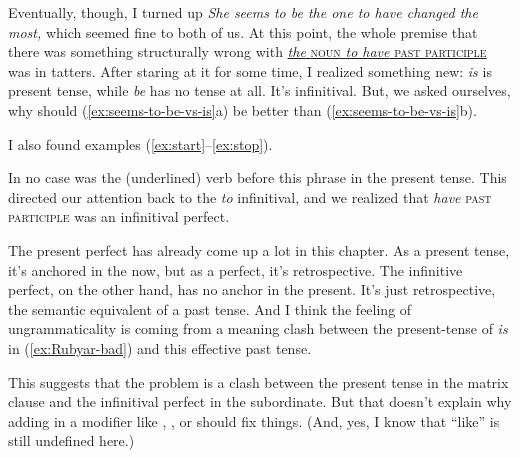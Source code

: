 Eventually, though, I turned up \textit{She seems to be the one to have changed the most,} which seemed fine to both of us. At this point, the whole premise that there was something structurally wrong with \uline{\textit{the} \textsc{noun} \textit{to have} \textsc{past participle}} was in tatters. After staring at it for some time, I realized something new: \textit{is} is present tense, while \textit{be} has no tense at all. It's infinitival. But, we asked ourselves, why should (\ref{ex:seems-to-be-vs-is}a) be better than (\ref{ex:seems-to-be-vs-is}b).

\ea \label{ex:seems-to-be-vs-is}
    \z
\z

\noindent I also found examples (\ref{ex:start}--\ref{ex:stop}).

\label{ex:start}\z
{}\z
{}\z
{}\z
{}\z
{}\label{ex:stop}\z

In no case was the (underlined) verb before this phrase in the present tense. This directed our attention back to the \textit{to} infinitival, and we realized that \textit{have} \textsc{past participle} was an infinitival perfect.

The present perfect has already come up a lot in this chapter. As a present tense, it's anchored in the now, but as a perfect, it's retrospective. The infinitive perfect, on the other hand, has no anchor in the present. It's just retrospective, the semantic equivalent of a past tense. And I think the feeling of ungrammaticality is coming from a meaning clash between the present-tense of \textit{is} in (\ref{ex:Rubyar-bad}) and this effective past tense.

This suggests that the problem is a clash between the present tense in the matrix clause and the infinitival perfect in the subordinate. But that doesn't explain why adding in a modifier like , , or  should fix things. (And, yes, I know that \enquote{like} is still undefined here.)


